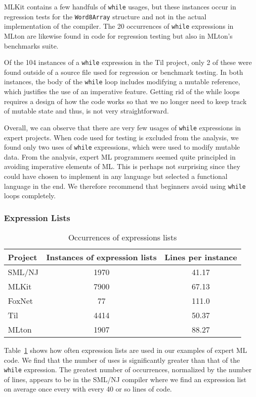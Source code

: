 \documentclass[12pt,abstracton]{scrartcl}
\begin{document}
MLKit contains a few handfuls of \texttt{while} usages, but these instances
occur in regression tests for the \texttt{Word8Array} structure and not in the actual implementation of the compiler.
The 20 occurrences of \texttt{while} expressions in MLton are likewise found in code for regression testing but
also in MLton's benchmarks suite.

Of the 104 instances of a \texttt{while} expression in the Til project,
only 2 of these were found outside of a source file used for regression or benchmark testing.
In both instances, the body of the \texttt{while} loop includes modifying a mutable reference, which justifies the use of
an imperative feature. Getting rid of the while loops requires a design of how the code works so
that we no longer need to keep track of mutable state and thus, is not very straightforward.

Overall, we can observe that there are very few usages of \texttt{while} expressions
in expert projects.
When code used for testing is excluded from the analysis, we found only two uses
of \texttt{while} expressions, which were used to modify mutable data.
From the analysis, expert ML programmers seemed quite principled in avoiding imperative
elements of ML. This is perhaps not surprising since they could have chosen
to implement in any language but selected a functional language in the end.
We therefore recommend that beginners avoid using \texttt{while} loops completely.
\subsubsection{Expression Lists}
\begin{table}[h!]
\centering
\begin{tabular}{|l||c|c|}
\hline
Project & Instances of expression lists & Lines per instance \\ \hline\hline
SML/NJ & 1970 & 41.17 \\
MLKit & 7900 & 67.13 \\
FoxNet & 77 & 111.0 \\
Til & 4414 & 50.37 \\
MLton & 1907 & 88.27 \\ \hline
\end{tabular}
\caption{Occurrences of expressions lists}
\label{table:explist}
\end{table}
Table~\ref{table:explist} shows how often expression lists are used in our
examples of expert ML code. We find that the number of uses is significantly
greater than that of the \texttt{while} expression. The greatest number
of occurrences, normalized by the number of lines, appears to be in the SML/NJ
compiler where we find an expression list on average once every with every
40 or so lines of code.
\end{document}
